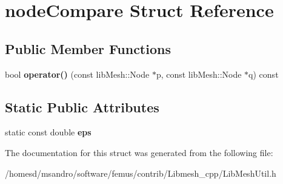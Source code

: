 \hypertarget{structnode_compare}{\section{node\-Compare Struct Reference}
\label{structnode_compare}
}
\subsection*{Public Member Functions}
\begin{DoxyCompactItemize}
\item 
\hypertarget{structnode_compare_af9460e8163ea400d84620bccc033639d}{bool {\bfseries operator()} (const lib\-Mesh\-::\-Node $\ast$p, const lib\-Mesh\-::\-Node $\ast$q) const }\label{structnode_compare_af9460e8163ea400d84620bccc033639d}

\end{DoxyCompactItemize}
\subsection*{Static Public Attributes}
\begin{DoxyCompactItemize}
\item 
\hypertarget{structnode_compare_a66792864fbc3fe22e785a68b246451ce}{static const double {\bfseries eps}}\label{structnode_compare_a66792864fbc3fe22e785a68b246451ce}

\end{DoxyCompactItemize}


The documentation for this struct was generated from the following file\-:\begin{DoxyCompactItemize}
\item 
/homesd/msandro/software/femus/contrib/\-Libmesh\-\_\-cpp/Lib\-Mesh\-Util.\-h\end{DoxyCompactItemize}

